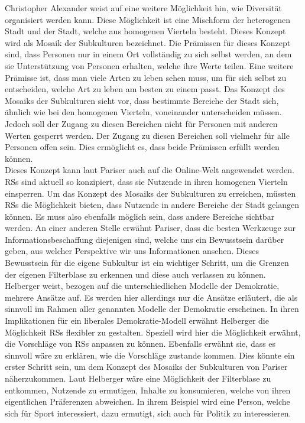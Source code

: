 Christopher Alexander weist auf eine weitere Möglichkeit hin, wie Diversität organisiert werden kann.
Diese Möglichkeit ist eine Mischform der heterogenen Stadt und der Stadt, welche aus homogenen Vierteln besteht.
Dieses Konzept wird als Mosaik der Subkulturen bezeichnet.
Die Prämissen für dieses Konzept sind, dass Personen nur in einem Ort vollständig zu sich selbst werden, an dem sie Unterstützung von Personen erhalten, welche ihre Werte teilen.
Eine weitere Prämisse ist, dass man viele Arten zu leben sehen muss, um für sich selbst zu entscheiden, welche Art zu leben am besten zu einem passt.
Das Konzept des Mosaiks der Subkulturen sieht vor, dass bestimmte Bereiche der Stadt sich, ähnlich wie bei den homogenen Vierteln, voneinander unterscheiden müssen.
Jedoch soll der Zugang zu diesen Bereichen nicht für Personen mit anderen Werten gesperrt werden.
Der Zugang zu diesen Bereichen soll vielmehr für alle Personen offen sein.
Dies ermöglicht es, dass beide Prämissen erfüllt werden können.\\

Dieses Konzept kann laut Pariser auch auf die Online-Welt angewendet werden.
\acp{RS} sind aktuell so konzipiert, dass sie Nutzende in ihren homogenen Vierteln einsperren.
Um das Konzept des Mosaiks der Subkulturen zu erreichen, müssten \acp{RS} die Möglichkeit bieten, dass Nutzende in andere Bereiche der Stadt gelangen können.
Es muss also ebenfalls möglich sein, dass andere Bereiche sichtbar werden.
An einer anderen Stelle erwähnt Pariser, dass die besten Werkzeuge zur Informationsbeschaffung diejenigen sind, welche uns ein Bewusstsein darüber geben, aus welcher Perspektive wir uns Informationen ansehen.
Dieses Bewusstsein für die eigene Subkultur ist ein wichtiger Schritt, um die Grenzen der eigenen Filterblase zu erkennen und diese auch verlassen zu können.\\

Helberger weist, bezogen auf die unterschiedlichen Modelle der Demokratie, mehrere Ansätze auf.
Es werden hier allerdings nur die Ansätze erläutert, die als sinnvoll im Rahmen aller genannten Modelle der Demokratie erscheinen.
In ihren Implikationen für ein liberales Demokratie-Modell erwähnt Helberger die Möglichkeit \acp{RS} flexibler zu gestalten.
Speziell wird hier die Möglichkeit erwähnt, die Vorschläge von \acp{RS} anpassen zu können.
Ebenfalls erwähnt sie, dass es sinnvoll wäre zu erklären, wie die Vorschläge zustande kommen.
Dies könnte ein erster Schritt sein, um dem Konzept des Mosaiks der Subkulturen von Pariser näherzukommen.
Laut Helberger wäre eine Möglichkeit der Filterblase zu entkommen, Nutzende zu ermutigen, Inhalte zu konsumieren, welche von ihren eigentlichen Präferenzen abweichen.
In ihrem Beispiel wird eine Person, welche sich für Sport interessiert, dazu ermutigt, sich auch für Politik zu interessieren.\\

